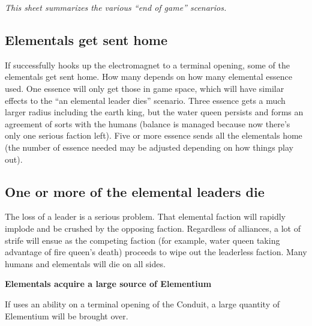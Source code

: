 \documentclass[green]{elementals}
\begin{document}
\name{\gEndGame{}}

\emph{This sheet summarizes the various ``end of game'' scenarios.}

\subsection{Elementals get sent home}

If \cGD{\intro} successfully hooks up the electromagnet to a terminal opening, some of the elementals get sent home. How many depends on how many elemental essence \cGD{} used. One essence will only get those in game space, which will have similar effects to the ``an elemental leader dies'' scenario. Three essence gets a much larger radius including the earth king, but the water queen persists and forms an agreement of sorts with the humans (balance is managed because now there's only one serious faction left). Five or more essence sends all the elementals home (the number of essence needed may be adjusted depending on how things play out).

\subsection{One or more of the elemental leaders die}

The loss of a leader is a serious problem. That elemental faction will rapidly implode and be crushed by the opposing faction. Regardless of alliances, a lot of strife will ensue as the competing faction (for example, water queen taking advantage of fire queen's death) proceeds to wipe out the leaderless faction. Many humans and elementals will die on all sides.

\textbf{Elementals acquire a large source of Elementium}

If \cScientist{\intro} uses an ability on a terminal opening of the Conduit, a large quantity of Elementium will be brought over.
\end{document}
